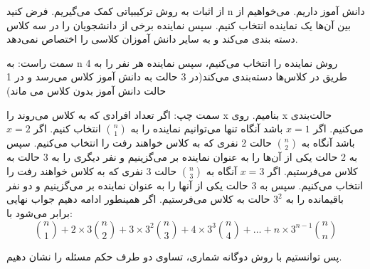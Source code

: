 \p
از اثبات به روش ترکیبیاتی کمک می‌گیریم.
فرض کنید n دانش آموز داریم. می‌خواهیم از بین آن‌ها یک نماینده انتخاب کنیم. سپس نماینده برخی از دانشجویان را در سه کلاس دسته بندی می‌کند و به سایر دانش آموزان کلاسی را اختصاص نمی‌دهد.

\p
سمت راست: به n روش نماینده را انتخاب می‌کنیم، سپس نماینده هر نفر را به 4 طریق در کلاس‌ها دسته‌بندی می‌کند(در 3 حالت به دانش آموز کلاس می‌رسد و در 1 حالت دانش آموز بدون کلاس می ماند)

\p
سمت چپ: اگر تعداد افرادی که به کلاس می‌روند را x بنامیم. روی x حالت‌بندی می‌کنیم.
اگر $x = 1$ باشد
آنگاه تنها می‌توانیم نماینده را به 
$\binom{n}{1}$
انتخاب کنیم. اگر $x = 2$ باشد آنگاه به
$\binom{n}{2}$
حالت 2 نفری که به کلاس خواهند رفت را انتخاب می‌کنیم. سپس به 2 حالت یکی از آن‌ها را به عنوان نماینده بر می‌گزینیم و نفر دیگری را به 3 حالت به کلاس می‌فرستیم.
اگر $x = 3$ آنگاه به
$\binom{n}{3}$
حالت 3 نفری که به کلاس خواهند رفت را انتخاب می‌کنیم. سپس به 3 حالت یکی از آنها را به عنوان نماینده بر می‌گزینیم و دو نفر باقیمانده را به 
$3^2$
حالت به کلاس می‌فرستیم.
اگر همینطور ادامه دهیم جواب نهایی برابر می‌شود با:
$$\binom{n}{1} + 2\times3\binom{n}{2} + 3\times3^2\binom{n}{3} + 4\times3^3\binom{n}{4} +\ldots +
n\times3^{n-1}\binom{n}{n}$$

\p
پس توانستیم با روش دوگانه شماری، تساوی دو طرف حکم مسئله را نشان دهیم.